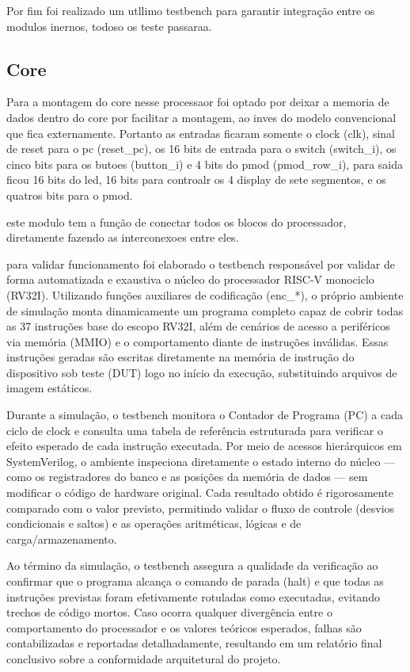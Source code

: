 Por fim foi realizado um utllimo testbench para garantir integração entre os modulos inernos, todoso os teste passaraa. 



\subsection{Core}
\label{sub:core}


Para a montagem do core nesse processaor foi optado por deixar a memoria de dados dentro do core por facilitar a montagem, ao inves do modelo convencional que fica externamente. Portanto as entradas ficaram somente o clock (clk), sinal de reset para o pc (reset_pc), os 16 bits de entrada para o switch (switch_i), os  cinco bits para os butoes (button_i) e 4 bits do pmod (pmod_row_i), para saida ficou 16 bits do led, 16 bits para controalr os 4 display de sete segmentos, e os quatros bits para o pmod.

este modulo tem a função de conectar todos os blocos do processador, diretamente fazendo as interconexoes entre eles.

para validar funcionamento foi elaborado o testbench responsável por validar de forma automatizada e exaustiva o núcleo do processador RISC-V monociclo (RV32I). Utilizando funções auxiliares de codificação (enc_*), o próprio ambiente de simulação monta dinamicamente um programa completo capaz de cobrir todas as 37 instruções base do escopo RV32I, além de cenários de acesso a periféricos via memória (MMIO) e o comportamento diante de instruções inválidas. Essas instruções geradas são escritas diretamente na memória de instrução do dispositivo sob teste (DUT) logo no início da execução, substituindo arquivos de imagem estáticos.

Durante a simulação, o testbench monitora o Contador de Programa (PC) a cada ciclo de clock e consulta uma tabela de referência estruturada para verificar o efeito esperado de cada instrução executada. Por meio de acessos hierárquicos em SystemVerilog, o ambiente inspeciona diretamente o estado interno do núcleo — como os registradores do banco e as posições da memória de dados — sem modificar o código de hardware original. Cada resultado obtido é rigorosamente comparado com o valor previsto, permitindo validar o fluxo de controle (desvios condicionais e saltos) e as operações aritméticas, lógicas e de carga/armazenamento.

Ao término da simulação, o testbench assegura a qualidade da verificação ao confirmar que o programa alcança o comando de parada (halt) e que todas as instruções previstas foram efetivamente rotuladas como executadas, evitando trechos de código mortos. Caso ocorra qualquer divergência entre o comportamento do processador e os valores teóricos esperados, falhas são contabilizadas e reportadas detalhadamente, resultando em um relatório final conclusivo sobre a conformidade arquitetural do projeto.

